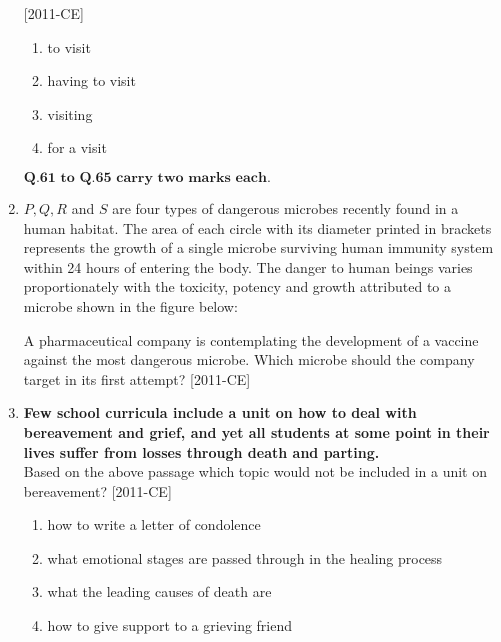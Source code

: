 \documentclass[journal]{IEEEtran}
\begin{document}
\begin{enumerate}[start=53]
    \hfill{[2011-CE]}
\begin{enumerate}
    \item to visit
    \item having to visit
    \item visiting
    \item for a visit
\end{enumerate}

$\textbf{Q.61 to Q.65 carry two marks each.}$
\item $P,Q,R$ and $S$ are four types of dangerous microbes recently found in a human habitat. The area of each circle with its diameter printed in brackets represents the growth of a single microbe surviving human immunity system within 24 hours of entering the body. The danger to human beings varies proportionately with the toxicity, potency and growth attributed to a microbe shown in the figure below:\\
\begin{figure}[H]
			\centering
			
			\label{61}
		\end{figure}
A pharmaceutical company is contemplating the development of a vaccine against the most dangerous microbe. Which microbe should the company target in its first attempt? \hfill{[2011-CE]}
\begin{enumerate}
\end{enumerate}
\item \textbf{Few school curricula include a unit on how to deal with bereavement and grief, and yet all students at some point in their lives suffer from losses through death and parting.}\\
Based on the above passage which topic would not be included in a unit on bereavement? \hfill{[2011-CE]}\\
\begin{enumerate}
    \item how to write a letter of condolence
    \item what emotional stages are passed through in the healing process
    \item what the leading causes of death are
    \item how to give support to a grieving friend

\end{enumerate}
\end{enumerate}
\end{document}
